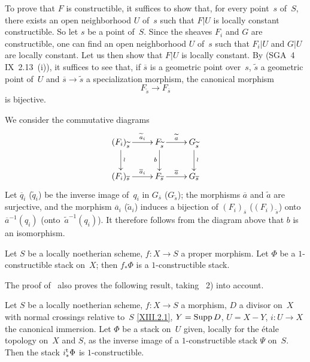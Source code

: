 To prove that $F$ is constructible, it suffices to show that, for
every point~$s$ of~$S$, there exists an open neighborhood $U$ of~$s$ such
that $F|U$ is locally constant constructible. So let $s$ be a
point of~$S$. Since the sheaves $F_i$ and $G$ are constructible, one
can find an open neighborhood $U$ of~$s$ such that $F_i|U$ and $G|U$
are locally constant. Let us then show that $F|U$ is locally
constant. By (SGA~4 IX~2.13~(i)), it suffices to see that, if
$\overline{s}$ is a geometric point over~$s$,
$\tilde{s}$ a geometric point of~$U$ and
$\overline{s}\to\tilde{s}$ a specialization morphism, the
canonical morphism
$$
F_{\tilde{s}}\to F_{\overline{s}}
$$
is bijective.

We consider the commutative diagrams
$$
\xymatrix{ (F_i)_{\tilde{s}} \ar[r]^-{\tilde{a}_i} \ar[d]^{\wr} &
F_{\tilde{s}} \ar[r]^-{\tilde{a}} \ar[d]_b & G_{\tilde{s}}
\ar[d]^{\wr}\\ (F_i)_{\overline{s}} \ar[r]^-{\overline{a}_i} &
F_{\overline{s}} \ar[r]^-{\overline{a}} & G_{\overline{s}} }
$$
Let $\overline{q}_i$ (\resp $\tilde{q}_i$) be the inverse image of~$q_i$
in $G_{\overline{s}}$ (\resp $G_{\tilde{s}}$); the morphisms
$\overline{a}$ and $\tilde{a}$ are surjective, and the morphism
$\overline{a}_i$ (\resp $\tilde{a}_i$) induces a bijection of
$(F_i)_{\overline{s}}$ (\resp $(F_i)_{\tilde{s}}$) onto~$\overline{a}^{-1}(q_i)$ (\resp onto~$\tilde{a}^{-1}(q_i)$). It therefore follows
from the diagram above that $b$ is an isomorphism.

\begin{corollary}
\label{XIII.6.2}
Let
$S$ be a locally noetherian scheme, $f\colon X\to S$
a proper morphism. Let $\Phi$ be a $1$-constructible stack on~$X$;
then $f_*\Phi$ is a \hbox{$1$-constructible} stack.
\end{corollary}

The proof of~ also proves the following
result, taking ~2) into account.

\begin{corollary}
\label{XIII.6.3}
Let $S$ be a locally noetherian scheme, $f\colon X\to S$ a
morphism, $D$ a divisor on~$X$ with normal crossings
relative to~$S$ \eqref{XIII.2.1}, $Y=\operatorname{Supp} D$, $U=X-Y$,
$i\colon U\to X$ the canonical immersion. Let $\Phi$ be a stack on~$U$
given, locally for the \'etale topology on~$X$ and $S$,
as the inverse image of a $1$-constructible stack $\Psi$ on~$S$. Then
the stack $i_*^{\mathrm{t}}\Phi$ is $1$-constructible.
\end{corollary}

